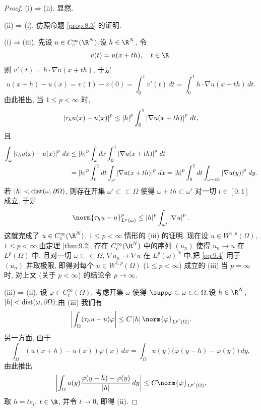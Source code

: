 \begin{proof}
\noindent (i)$\Rightarrow$(ii). 显然.

\noindent (ii)$\Rightarrow$(i). 仿照命题  \ref{prop:8.3} 的证明.

\noindent (i)$\Rightarrow$(iii). 先设 $u\in C_c^\infty(\R^N)$.设 $h\in\R^N$,
令
\begin{equation*}
v(t)=u(x+th),\quad t\in\R.
\end{equation*}
则 $v'(t)=h\cdot\nabla u(x+th)$, 于是
\begin{equation*}
u(x+h)-u(x)=v(1)-v(0)=\int_0^1v'(t)\,dt
=\int_0^1h\cdot\nabla u(x+th)\,dt.
\end{equation*}
由此推出, 当 $1\le p<\infty$ 时,
\begin{equation*}
\left|\tau_hu(x)-u(x)\right|^p\le\left|h\right|^p\int_0^1
\left|\nabla u(x+th)\right|^p\,dt,
\end{equation*}
且
\begin{align*}
\int_\omega\left|\tau_hu(x)-u(x)\right|^p\,dx
&\le\left|h\right|^p\int_\omega dx\int_0^1\left|\nabla u(x+th)\right|^p\,dt\\
&=\left|h\right|^p\int_0^1dt\int_\omega\left|\nabla u(x+th)\right|^p\,dx
=\left|h\right|^p\int_0^1dt\int_{\omega+th}\left|\nabla u(y)\right|^p\,dy.
\end{align*}
若 $\left|h\right|<\operatorname{dist}(\omega,\partial\Omega)$, 则存在开集
$\omega'\subset\subset\Omega$ 使得 $\omega+th\subset\omega'$ 对一切
$t\in[0,1]$ 成立, 于是
\begin{equation}
\norm{\tau_hu-u}_{L^p(\omega)}^p\le\abs{h}^p\int_{\omega'}
\abs{\nabla u}^p.
\label{eq:9.4}
\end{equation}
这就完成了 $u\in C_c^\infty(\R^N)$, $1\le p<\infty$ 情形的 (iii) 的证明.
现在设 $u\in W^{1,p}(\Omega)$, $1\le p<\infty$.由定理  \ref{thm:9.2}, 存在
$C_c^\infty(\R^N)$ 中的序列 $(u_n)$ 使得 $u_n\to u$ 在 $L^p(\Omega)$ 中,
且对一切 $\omega\subset\subset\Omega$, $\nabla u_n\to\nabla u$ 在
$L^p(\omega)^N$ 中.把 \eqref{eq:9.4} 用于 $(u_n)$ 并取极限, 即得对每个
$u\in W^{1,p}(\Omega)$ ($1\le p<\infty$) 成立的 (iii).当 $p=\infty$ 时,
对上文 (关于 $p<\infty$) 的结论令 $p\to\infty$.

\noindent (iii)$\Rightarrow$(ii). 设 $\varphi\in C_c^\infty(\Omega)$, 考虑开集
$\omega$ 使得 $\supp\varphi\subset\omega\subset\subset\Omega$.设 $h\in\R^N$,
$\left|h\right|<\operatorname{dist}(\omega,\partial\Omega)$.由 (iii) 我们有
\begin{equation*}
\left|\int_\Omega(\tau_hu-u)\varphi\right|
\le C\abs{h}\norm{\varphi}_{L^{p'}(\Omega)}.
\end{equation*}
另一方面, 由于
\begin{equation*}
\int_\Omega(u(x+h)-u(x))\varphi(x)\,dx
=\int_\Omega u(y)\bigl(\varphi(y-h)-\varphi(y)\bigr)\,dy,
\end{equation*}
由此推出
\begin{equation*}
\left|\int_\Omega u(y)\frac{\varphi(y-h)-\varphi(y)}{\abs{h}}\,dy\right|
\le C\norm{\varphi}_{L^{p'}(\Omega)}.
\end{equation*}
取 $h=te_i$, $t\in\R$, 并令 $t\to0$, 即得 (ii).
\end{proof}


